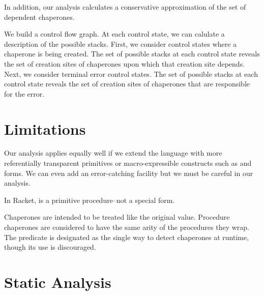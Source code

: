 \documentclass{sigplanconf}
\begin{document}
In addition, our analysis calculates a conservative approximation of the set of dependent chaperones.

We build a control flow graph.
At each control state, we can calulate a description of the possible stacks.
First, we consider control states where a chaperone is being created.
The set of possible stacks at each control state reveals the set of creation sites of chaperones upon which that creation site depends.
Next, we consider terminal error control states.
The set of possible stacks at each control state reveals the set of creation sites of chaperones that are responsible for the error.

\section{Limitations}

Our analysis applies equally well if we extend the language with more referentially transparent primitives or macro-expressible constructs such as  and  forms.
We can even add an error-catching facility but we must be careful in our analysis.

In Racket,  is a primitive procedure--not a special form.

Chaperones are intended to be treated like the original value.
Procedure chaperones are considered to have the same arity of the procedures they wrap.
The  predicate is designated as the single way to detect chaperones at runtime, though its use is discouraged.


\section{Static Analysis}


\end{document}

